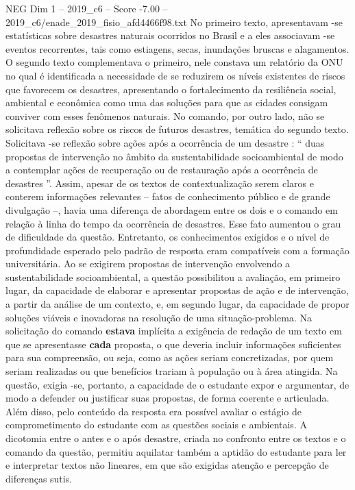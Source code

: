 \begin{textsample}{NEG Dim 1 – 2019\_c6 – Score -7.00 – 2019\_c6/enade\_2019\_fisio\_afd4466f98.txt}
No primeiro texto, apresentavam -se estatísticas sobre desastres naturais ocorridos no Brasil e a eles associavam -se eventos recorrentes, tais como estiagens, secas, inundações bruscas e alagamentos.
O segundo texto complementava o primeiro, nele constava um relatório da ONU no qual é identificada a necessidade de se reduzirem os níveis existentes de riscos que favorecem os desastres, apresentando o fortalecimento da resiliência social, ambiental e econômica como uma das soluções para que as cidades consigam conviver com esses fenômenos naturais.
No comando, por outro lado, não se solicitava reflexão sobre os riscos de futuros desastres, temática do segundo texto.
Solicitava -se reflexão sobre ações após a ocorrência de um desastre : “ duas propostas de intervenção no âmbito da sustentabilidade socioambiental de modo a contemplar ações de recuperação ou de restauração após a ocorrência de desastres ”.
Assim, apesar de os textos de contextualização serem claros e conterem informações relevantes – fatos de conhecimento público e de grande divulgação –, havia uma diferença de abordagem entre os dois e o comando em relação à linha do tempo da ocorrência de desastres.
Esse fato aumentou o grau de dificuldade da questão.
Entretanto, os conhecimentos exigidos e o nível de profundidade esperado pelo padrão de resposta eram compatíveis com a formação universitária.
Ao se exigirem propostas de intervenção envolvendo a sustentabilidade socioambiental, a questão possibilitou a avaliação, em primeiro lugar, da capacidade de elaborar e apresentar propostas de ação e de intervenção, a partir da análise de um contexto, e, em segundo lugar, da capacidade de propor soluções viáveis e inovadoras na resolução de uma situação-problema.
Na solicitação do comando \textbf{estava} implícita a exigência de redação de um texto em que se apresentasse \textbf{cada} proposta, o que deveria incluir informações suficientes para sua compreensão, ou seja, como as ações seriam concretizadas, por quem seriam realizadas ou que benefícios trariam à população ou à área atingida.
Na questão, exigia -se, portanto, a capacidade de o estudante expor e argumentar, de modo a defender ou justificar suas propostas, de forma coerente e articulada.
Além disso, pelo conteúdo da resposta era possível avaliar o estágio de comprometimento do estudante com as questões sociais e ambientais.
A dicotomia entre o antes e o após desastre, criada no confronto entre os textos e o comando da questão, permitiu aquilatar também a aptidão do estudante para ler e interpretar textos não lineares, em que são exigidas atenção e percepção de diferenças sutis.

\end{textsample}
